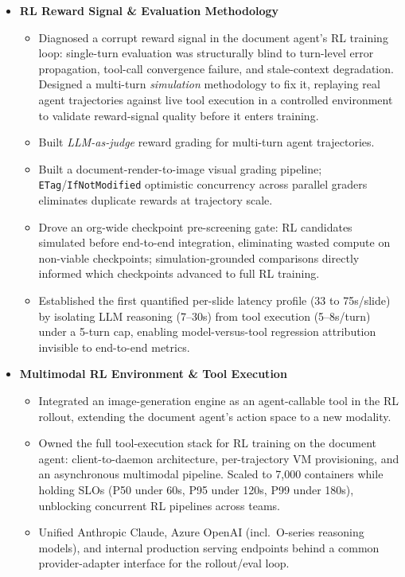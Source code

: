 \documentclass[letterpaper,11pt]{article}
\newcommand{\resumeSubListItemWithoutDesc}[1]{
  \vspace{2pt}\item\small{{ #1 \vspace{-2pt}}}
}
\newcommand{\resumeItemSubListHeading}[1]{
  \vspace{1pt}\item\small{\textbf{#1}\vspace{-1pt}}
}
\newcommand{\resumeItemListStart}{\begin{itemize}}
\newcommand{\resumeItemSubListStart}{\begin{itemize}}
\newcommand{\resumeItemSubListEnd}{\end{itemize}\vspace{-5pt}}
\newcommand{\resumeItemListEnd}{\end{itemize}\vspace{-5pt}}
\begin{document}
    \resumeItemListStart
      \resumeItemSubListHeading{RL Reward Signal \& Evaluation Methodology}
        \resumeItemSubListStart
          \resumeSubListItemWithoutDesc{Diagnosed a corrupt reward signal in the document agent's RL training loop: single-turn evaluation was structurally blind to turn-level error propagation, tool-call convergence failure, and stale-context degradation. Designed a multi-turn \textit{simulation} methodology to fix it, replaying real agent trajectories against live tool execution in a controlled environment to validate reward-signal quality before it enters training.}
          \resumeSubListItemWithoutDesc{Built \textit{LLM-as-judge} reward grading for multi-turn agent trajectories.}
          \resumeSubListItemWithoutDesc{Built a document-render-to-image visual grading pipeline; \texttt{ETag}/\texttt{IfNotModified} optimistic concurrency across parallel graders eliminates duplicate rewards at trajectory scale.}
          \resumeSubListItemWithoutDesc{Drove an org-wide checkpoint pre-screening gate: RL candidates simulated before end-to-end integration, eliminating wasted compute on non-viable checkpoints; simulation-grounded comparisons directly informed which checkpoints advanced to full RL training.}
          \resumeSubListItemWithoutDesc{Established the first quantified per-slide latency profile (33 to 75s/slide) by isolating LLM reasoning (7--30s) from tool execution (5--8s/turn) under a 5-turn cap, enabling model-versus-tool regression attribution invisible to end-to-end metrics.}
        \resumeItemSubListEnd
    \resumeItemListEnd

    \resumeItemListStart
      \resumeItemSubListHeading{Multimodal RL Environment \& Tool Execution}
        \resumeItemSubListStart
          \resumeSubListItemWithoutDesc{Integrated an image-generation engine as an agent-callable tool in the RL rollout, extending the document agent's action space to a new modality.}
          \resumeSubListItemWithoutDesc{Owned the full tool-execution stack for RL training on the document agent: client-to-daemon architecture, per-trajectory VM provisioning, and an asynchronous multimodal pipeline. Scaled to 7,000 containers while holding SLOs (P50 under 60s, P95 under 120s, P99 under 180s), unblocking concurrent RL pipelines across teams.}
          \resumeSubListItemWithoutDesc{Unified Anthropic Claude, Azure OpenAI (incl.\ O-series reasoning models), and internal production serving endpoints behind a common provider-adapter interface for the rollout/eval loop.}
        \resumeItemSubListEnd
    \resumeItemListEnd
\end{document}
